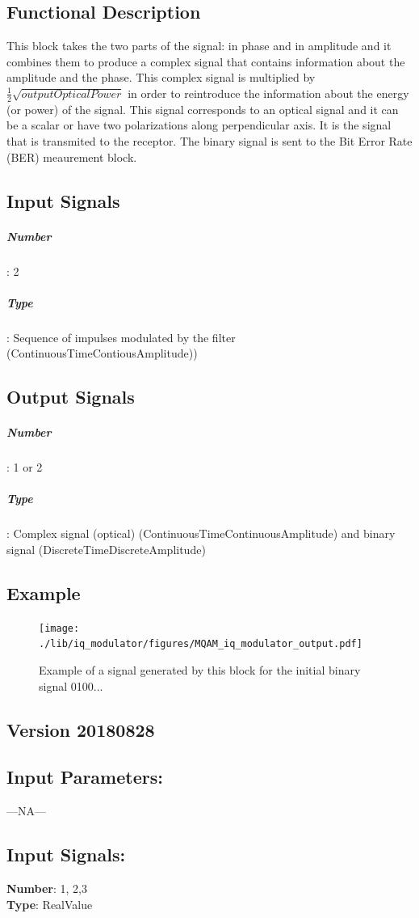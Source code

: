 \subsection*{Functional Description}
This block takes the two parts of the signal: in phase and in amplitude and it combines them to produce a complex signal that contains information about the amplitude and the phase.
This complex signal is multiplied by $\frac{1}{2}\sqrt{\textit{outputOpticalPower}}$ in order to reintroduce the information about the energy (or power) of the signal. This signal corresponds to an optical signal and it can be a scalar or have two polarizations along perpendicular axis. It is the signal that is transmited to the receptor.
The binary signal is sent to the Bit Error Rate (BER) meaurement block.
\subsection*{Input Signals}
\subparagraph*{Number}: 2
\subparagraph*{Type}: Sequence of impulses modulated by the filter (ContinuousTimeContiousAmplitude))
\subsection*{Output Signals}
\subparagraph*{Number}: 1 or 2
\subparagraph*{Type}: Complex signal (optical) (ContinuousTimeContinuousAmplitude) and binary signal (DiscreteTimeDiscreteAmplitude)
\subsection*{Example}
\begin{figure}[h]
	\centering
	\texttt{[image: ./lib/iq\_modulator/figures/MQAM\_iq\_modulator\_output.pdf]}
	\label{MQAM8_DeterministicAppendZeros}\caption{Example of a signal generated by this block for the initial binary signal 0100...}
\end{figure}
\subsection*{Version 20180828}
\subsection*{Input Parameters:}
---NA---

\subsection*{Input Signals:}
\textbf{Number}: 1, 2,3\\
\textbf{Type}: RealValue
